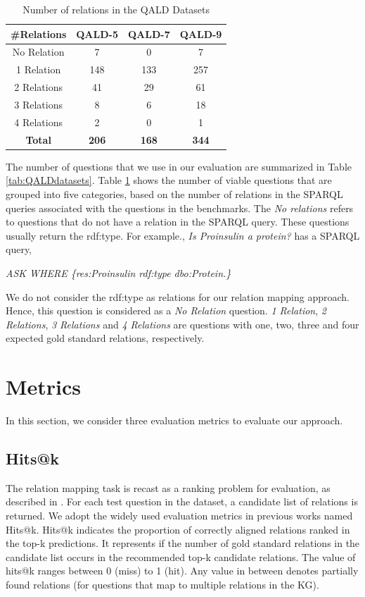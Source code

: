 \begin{table}
    \centering
    \begin{tabular}{|c|c|c|c|}
    \hline
    \textbf{\#Relations} & \textbf{QALD-5} & \textbf{QALD-7} & \textbf{QALD-9} \\
    \hline
     No Relation & 7  & 0 & 7\\
     \hline
    1 Relation & 148 & 133 & 257\\ 
     \hline
    2 Relations & 41 & 29 & 61\\
     \hline
    3 Relations & 8  & 6 & 18\\
     \hline
    4 Relations & 2  & 0 & 1\\
     \hline
    \textbf{Total} & \textbf{206}  & \textbf{168} & \textbf{344}\\
     \hline
    \end{tabular}
    \caption{Number of relations in the QALD Datasets}
    \label{tab:QALDrelations}
\end{table}

The number of questions that we use in our evaluation are summarized in Table \ref{tab:QALDdatasets}. Table \ref{tab:QALDrelations} shows the number of viable questions that are grouped into five categories, based on the number of relations in the SPARQL queries associated with the questions in the benchmarks. The \textit{No relations} refers to questions that do not have a relation in the SPARQL query. These questions usually return the rdf:type. For example., \textit{Is Proinsulin a protein?} has a SPARQL query,

{\selectfont
\textit{
ASK WHERE \{res:Proinsulin rdf:type dbo:Protein.\} 
}}

We do not consider the rdf:type as relations for our relation mapping approach. Hence, this question is considered as a\textit{ No Relation} question. \textit{1 Relation}, \textit{2 Relations}, \textit{3 Relations} and \textit{4 Relations} are questions with one, two, three and four expected gold standard relations, respectively.

\section{Metrics}
In this section, we consider three evaluation metrics to evaluate our approach.

\subsection{Hits@k}
The relation mapping task is recast as a ranking problem for evaluation, as described in \cite{sun2019pullnet, 10.1145/3437963.3441753}. For each test question in the dataset, a candidate list of relations is returned. We adopt the widely used evaluation metrics in previous works named Hits@k. Hits@k indicates the proportion of correctly aligned relations ranked in the top-k predictions. It represents if the number of gold standard relations in the candidate list occurs in the recommended top-k candidate relations. The value of hits@k ranges between 0 (miss) to 1 (hit). Any value in between denotes partially found relations (for questions that map to multiple relations in the KG).

